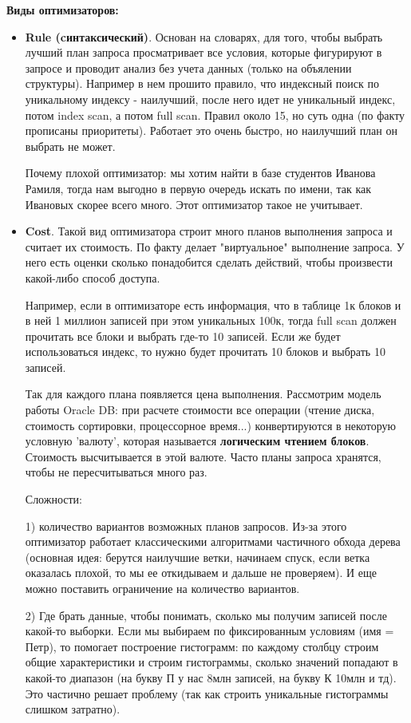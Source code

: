 \textbf{Виды оптимизаторов:} 
\begin{itemize}
    \item \textbf{Rule (cинтаксический)}. Основан на словарях, для того, чтобы выбрать лучший план запроса просматривает все условия, которые фигурируют в запросе и проводит анализ без учета данных (только на объялении структуры). Например в нем прошито правило, что индексный поиск по уникальному индексу - наилучший, после него идет не уникальный индекс, потом index scan, а потом full scan. Правил около 15, но суть одна (по факту прописаны приоритеты). Работает это очень быстро, но наилучший план он выбрать не может.
    
Почему плохой оптимизатор: мы хотим найти в базе студентов Иванова Рамиля, тогда нам выгодно в первую очередь искать по имени, так как Ивановых скорее всего много. Этот оптимизатор такое не учитывает. 

\item \textbf{Cost}. Такой вид оптимизатора строит много планов выполнения запроса и считает их стоимость. По факту делает "виртуальное" выполнение запроса. У него есть оценки сколько понадобится сделать действий, чтобы произвести какой-либо способ доступа. 
    
Например, если в оптимизаторе есть информация, что в таблице 1к блоков и в ней 1 миллион записей при этом уникальных 100к, тогда full scan должен прочитать все блоки и выбрать где-то 10 записей. Если же будет использоваться индекс, то нужно будет прочитать 10 блоков и выбрать 10 записей. 
    
Так для каждого плана появляется цена выполнения. Рассмотрим модель работы Oracle DB: при расчете стоимости все операции (чтение диска, стоимость сортировки, процессорное время...) конвертируются в некоторую условную 'валюту', которая называется \textbf{логическим чтением блоков}. Стоимость высчитывается в этой валюте. Часто планы запроса хранятся, чтобы не пересчитываться много раз. 
    
Сложности: 
    
1) количество вариантов возможных планов запросов. Из-за этого оптимизатор работает классическими алгоритмами частичного обхода дерева (основная идея: берутся наилучшие ветки, начинаем спуск, если ветка оказалась плохой, то мы ее откидываем и дальше не проверяем). И еще можно поставить ограничение на количество вариантов. 
    
2) Где брать данные, чтобы понимать, сколько мы получим записей после какой-то выборки. Если мы выбираем по фиксированным условиям (имя = Петр), то помогает построение гистограмм: по каждому столбцу строим общие характеристики и строим гистограммы, сколько значений попадают в какой-то диапазон (на букву П у нас 8млн записей, на букву К 10млн и тд). Это частично решает проблему (так как строить уникальные гистограммы слишком затратно). 
    

\end{itemize}
